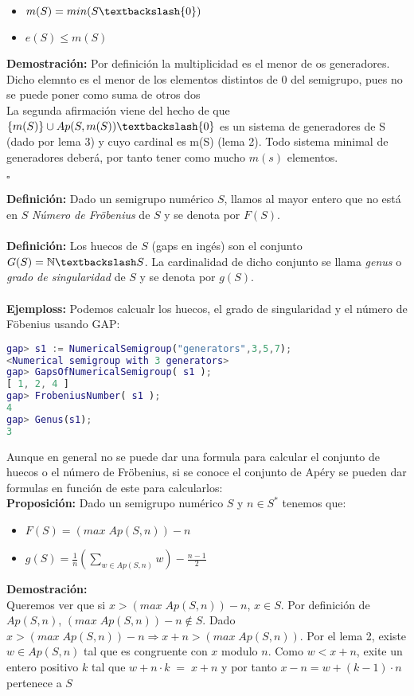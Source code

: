 \documentclass[10pt,spanish]{book}
\newcommand{\qed}{\begin{flushright} $\square$ \end{flushright}}
\begin{document}
\begin{itemize}
	\item $m(S) = min(S\textbackslash \{0\})$
	\item $e(S)\leq m(S)$
\end{itemize} 
\textbf{Demostración:} Por definición la multiplicidad es el menor de os generadores. Dicho elemnto es el menor de los elementos distintos de $0$ del semigrupo, pues no se puede poner como suma de otros dos \\
La segunda afirmación viene del hecho de que $\{m(S)\}\cup Ap(S,m(S))\textbackslash\{0\}$ es un sistema de generadores de S (dado por lema 3) y cuyo cardinal es m(S) (lema 2). Todo sistema minimal de generadores deberá, por tanto tener como mucho $m(s)$ elementos.
\qed
\textbf{Definición:} Dado un semigrupo numérico $S$, llamos al mayor entero que no está en $S$ \textit{Número de Fröbenius} de $S$ y se denota por $F(S)$. \\
\\ \textbf{Definición:} Los huecos de $S$ (gaps en ingés) son el conjunto $G(S)=\mathbb{N}\textbackslash S$. La cardinalidad de dicho conjunto se llama \textit{genus} o \textit{grado de singularidad} de $S$ y se denota por $g(S)$.\\
\\ \textbf{Ejemploss: } Podemos calcualr los huecos, el grado de singularidad y el número de Föbenius usando GAP:
\begin{lstlisting}[language=gap]
gap> s1 := NumericalSemigroup("generators",3,5,7);
<Numerical semigroup with 3 generators>
gap> GapsOfNumericalSemigroup( s1 );
[ 1, 2, 4 ]
gap> FrobeniusNumber( s1 );
4
gap> Genus(s1);
3
\end{lstlisting}
Aunque en general no se puede dar una formula para calcular el conjunto de huecos o el número de Fröbenius, si se conoce el conjunto de Apéry se pueden dar formulas en función de este para calcularlos:\\
\textbf{Proposición:} Dado un semigrupo numérico $S$ y $n\in S^{*}$ tenemos que:
\begin{itemize}
\item $F(S)=(max\;Ap(S,n))-n$
\item $g(S)=\frac{1}{n}(\sum_{w\in Ap(S,n)} w)-\frac{n-1}{2}$
\end{itemize}
\textbf{Demostración:}\\
Queremos ver que si $x>(max\;Ap(S,n))-n$, $x\in S$. Por definición de $Ap(S,n)$, $(max\;Ap(S,n))-n \notin S$. Dado $x>(max\;Ap(S,n))-n\Rightarrow x+n>(max\;Ap(S,n))$. Por el lema 2, existe $w\in Ap(S,n)$ tal que es congruente con $x$ modulo $n$. Como $w<x+n$, exite un entero positivo $k$ tal que $w+n\cdot k\;=\; x+n $ y por tanto $x-n=w+(k-1)\cdot n$ pertenece a $S$\\
\end{document}
